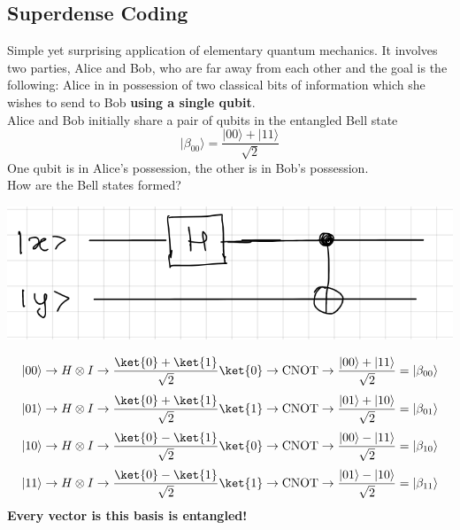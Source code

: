 \documentclass[10pt]{report}
\begin{document}
\subsection{Superdense Coding}
Simple yet surprising application of elementary quantum mechanics. It involves two parties, Alice and Bob, who are far away from each other and the goal is the following: Alice in in possession of two classical bits of information which she wishes to send to Bob \textbf{using a single qubit}.\\
Alice and Bob initially share a pair of qubits in the entangled Bell state $$|\beta_{00}\rangle = \frac{|00\rangle + |11\rangle}{\sqrt{2}}$$
One qubit is in Alice's possession, the other is in Bob's possession.\\
How are the Bell states formed?
\begin{center}
	\includegraphics[scale=0.5]{15.png}
\end{center}
$$|00\rangle \rightarrow H\otimes I\rightarrow \frac{\ket{0}+\ket{1}}{\sqrt{2}}\ket{0}\rightarrow\hbox{CNOT}\rightarrow\frac{|00\rangle+|11\rangle}{\sqrt{2}} = |\beta_{00}\rangle$$
$$|01\rangle \rightarrow H\otimes I\rightarrow \frac{\ket{0}+\ket{1}}{\sqrt{2}}\ket{1}\rightarrow\hbox{CNOT}\rightarrow\frac{|01\rangle+|10\rangle}{\sqrt{2}} = |\beta_{01}\rangle$$
$$|10\rangle \rightarrow H\otimes I\rightarrow \frac{\ket{0}-\ket{1}}{\sqrt{2}}\ket{0}\rightarrow\hbox{CNOT}\rightarrow\frac{|00\rangle-|11\rangle}{\sqrt{2}} = |\beta_{10}\rangle$$
$$|11\rangle \rightarrow H\otimes I\rightarrow \frac{\ket{0}-\ket{1}}{\sqrt{2}}\ket{1}\rightarrow\hbox{CNOT}\rightarrow\frac{|01\rangle-|10\rangle}{\sqrt{2}} = |\beta_{11}\rangle$$
\textbf{Every vector is this basis is entangled!}
\end{document}
